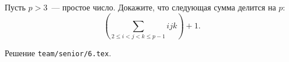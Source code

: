 \problem{}
Пусть $p > 3$~--- простое число.
Докажите, что следующая сумма делится на $p$:
\[
    \left(
        \sum_{2 \leq i < j < k \leq p-1}
            i j k
    \right)
    + 1
.\]

\solution
Решение \texttt{team/senior/6.tex}.
\endproblem
